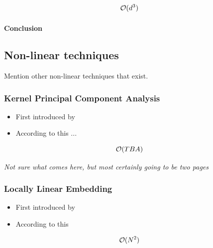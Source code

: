 $$\mathcal{O}(d^3)$$


\clearpage

\paragraph{Conclusion}



\clearpage




\subsection{Non-linear techniques}

Mention other non-linear techniques that exist.





\subsubsection{Kernel Principal Component Analysis}

\begin{itemize}
	\item First introduced by \cite{scholkopf1998nonlinear}
	\item According to this ...%
\end{itemize}

$$\mathcal{O}(TBA)$$

\clearpage

\begin{center}
	\textit{Not sure what comes here, but most certainly going to be two pages}
\end{center}

\clearpage







\subsubsection{Locally Linear Embedding}

\begin{itemize}
	\item First introduced by \cite{roweis2000nonlinear}
	\item According to this \cite{DRUnsupervisedNearestNeighbors}
\end{itemize}

$$\mathcal{O}(N^2)$$

